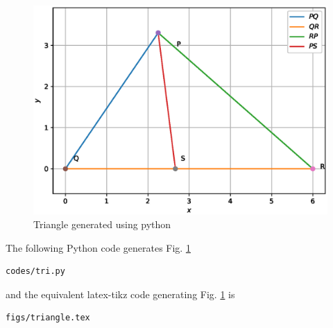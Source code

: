 \begin{enumerate}[label=\thesection.\arabic*.,ref=\thesection.\theenumi]
\begin{figure}[!ht]
\centering
\includegraphics[width=\columnwidth]{./codes/tri.eps}
\caption{Triangle generated using python}
\label{fig:triangle2}
\end{figure} 

\solution The  following Python code generates Fig. \ref{fig:triangle2}

\begin{lstlisting}
codes/tri.py
\end{lstlisting}

and the equivalent latex-tikz code generating Fig. \ref{fig:triangle2} is 
\begin{lstlisting}
figs/triangle.tex
\end{lstlisting}
%
\end{enumerate}
  

